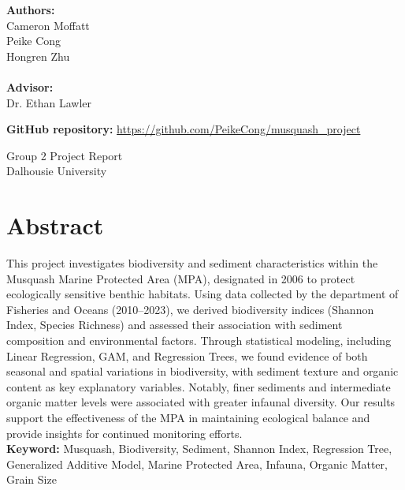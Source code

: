 \documentclass[12pt]{article}
\begin{document}
\begin{titlepage}
\vspace{2cm}
\textbf{Authors:}\\
Cameron Moffatt\\
Peike Cong\\
Hongren Zhu\\
\qquad\\
\textbf{Advisor:}\\
Dr. Ethan Lawler\\


\vspace{3 cm}


\begin{center}
\textbf{GitHub repository: } \url{https://github.com/PeikeCong/musquash_project}
\end{center}

\vspace{3cm}
Group 2 Project Report\\
Dalhousie University

\vspace{1 cm}
\vfill
	
\end{titlepage}


\newpage
\thispagestyle{empty} %

\section*{Abstract}

\qquad This project investigates biodiversity and sediment characteristics
within the Musquash Marine Protected Area (MPA), designated in 2006 to protect
ecologically sensitive benthic habitats. Using data collected by the department
of Fisheries and Oceans (2010–2023), we derived biodiversity indices (Shannon Index,
Species Richness) and assessed their association with sediment composition and
environmental factors. Through statistical modeling, including Linear
Regression, GAM, and Regression Trees, we found evidence of both seasonal and
spatial variations in biodiversity, with sediment texture and organic content as
key explanatory variables. Notably, finer sediments and intermediate organic
matter levels were associated with greater infaunal diversity. Our results
support the effectiveness of the MPA in maintaining ecological balance and
provide insights for continued monitoring efforts.\\

\textbf{Keyword: }Musquash, Biodiversity, Sediment, Shannon Index, Regression
Tree, Generalized Additive Model, Marine Protected Area, Infauna, Organic
Matter, Grain Size
\end{document}
